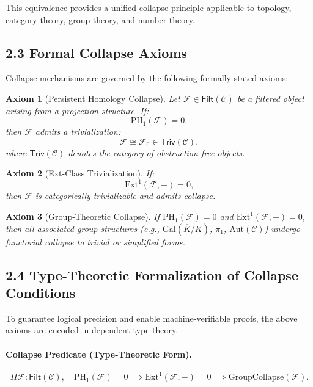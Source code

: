 \documentclass[11pt]{article}
\newtheorem{axiom}{Axiom}[section]
\begin{document}
This equivalence provides a unified collapse principle applicable to topology, category theory, group theory, and number theory.

\subsection*{2.3 Formal Collapse Axioms}

Collapse mechanisms are governed by the following formally stated axioms:

\begin{axiom}[Persistent Homology Collapse]
Let $\mathcal{F} \in \mathsf{Filt}(\mathcal{C})$ be a filtered object arising from a projection structure. If:
\[
\mathrm{PH}_1(\mathcal{F}) = 0,
\]
then $\mathcal{F}$ admits a trivialization:
\[
\mathcal{F} \cong \mathcal{F}_0 \in \mathsf{Triv}(\mathcal{C}),
\]
where $\mathsf{Triv}(\mathcal{C})$ denotes the category of obstruction-free objects.
\end{axiom}

\begin{axiom}[Ext-Class Trivialization]
If:
\[
\mathrm{Ext}^1(\mathcal{F}, -) = 0,
\]
then $\mathcal{F}$ is categorically trivializable and admits collapse.
\end{axiom}

\begin{axiom}[Group-Theoretic Collapse]
If $\mathrm{PH}_1(\mathcal{F}) = 0$ and $\mathrm{Ext}^1(\mathcal{F}, -) = 0$, then all associated group structures (e.g., $\mathrm{Gal}(\overline{K}/K)$, $\pi_1$, $\mathrm{Aut}(\mathcal{C})$) undergo functorial collapse to trivial or simplified forms.
\end{axiom}

\subsection*{2.4 Type-Theoretic Formalization of Collapse Conditions}

To guarantee logical precision and enable machine-verifiable proofs, the above axioms are encoded in dependent type theory.

\paragraph{Collapse Predicate (Type-Theoretic Form).}
\[
\Pi \mathcal{F} : \mathsf{Filt}(\mathcal{C}), \quad \mathrm{PH}_1(\mathcal{F}) = 0 \implies \mathrm{Ext}^1(\mathcal{F}, -) = 0 \implies \mathrm{GroupCollapse}(\mathcal{F}).
\]
\end{document}
